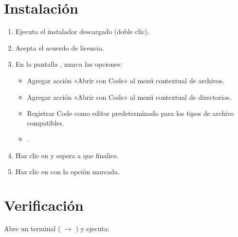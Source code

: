 \documentclass[letterpaper,10pt,english]{sphinxmanual}
\begin{document}
\section{Instalación}
\label{\detokenize{vscode:instalacion}}\begin{enumerate}
%
\item {} 
\sphinxAtStartPar
Ejecuta el instalador descargado (doble clic).

\item {} 
\sphinxAtStartPar
Acepta el acuerdo de licencia.

\item {} 
\sphinxAtStartPar
En la pantalla , marca  las opciones:
\begin{itemize}
\item {} 
\sphinxAtStartPar
Agregar acción «Abrir con Code» al menú contextual de archivos.

\item {} 
\sphinxAtStartPar
Agregar acción «Abrir con Code» al menú contextual de directorios.

\item {} 
\sphinxAtStartPar
Registrar Code como editor predeterminado para los tipos de archivo compatibles.

\item {} 
\sphinxAtStartPar
{} .

\end{itemize}

\item {} 
\sphinxAtStartPar
Haz clic en  y espera a que finalice.

\item {} 
\sphinxAtStartPar
Haz clic en  con la opción  marcada.

\end{enumerate}


\section{Verificación}
\label{\detokenize{vscode:verificacion}}
\sphinxAtStartPar
Abre un terminal ( \(\rightarrow\) ) y ejecuta:

\begin{sphinxVerbatim}[commandchars=\\\{\}]
 
\end{sphinxVerbatim}
\end{document}
